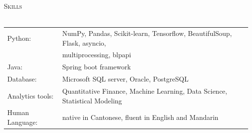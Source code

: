 \documentclass[a4paper]{article}
\newcommand{\lineunder} {
    \vspace*{-8pt} \\
    \hspace*{-18pt} \hrulefill \\
}
\newcommand{\header} [1] {
    {\hspace*{-18pt}\vspace*{6pt} \textsc{#1}}
    \vspace*{-6pt} \lineunder
}
\begin{document}
\header{Skills}
\begin{tabular}{ l l }
	Python:          & NumPy, Pandas, Scikit-learn, Tensorflow, BeautifulSoup, Flask, asyncio,    \\
                     & multiprocessing, blpapi                                                    \\
	Java:            & Spring boot framework                                                      \\
	Database:        & Microsoft SQL server, Oracle, PostgreSQL                                   \\
	Analytics tools: & Quantitative Finance, Machine Learning, Data Science, Statistical Modeling \\
        Human Language:  & native in Cantonese, fluent in English and Mandarin
\end{tabular}
\vspace{2mm}
\end{document}
